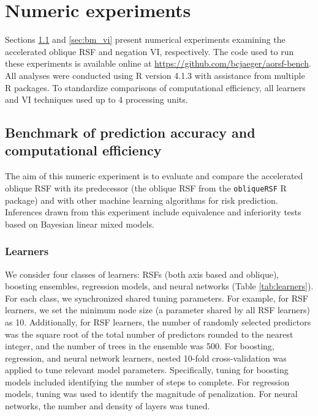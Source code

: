 \documentclass[twoside,11pt]{article}\usepackage[]{graphicx}\usepackage[]{xcolor}
\newcommand{\tabref}[1]{Table \ref{#1}}
\begin{document}
\section{Numeric experiments}




Sections \ref{sec:bm_pred} and \ref{sec:bm_vi} present numerical experiments examining the accelerated oblique RSF and negation VI, respectively. The code used to run these experiments is available online at \href{https://github.com/bcjaeger/aorsf-bench}{https://github.com/bcjaeger/aorsf-bench}. All analyses were conducted using R version 4.1.3 with assistance from multiple R packages. To standardize comparisons of computational efficiency, all learners and VI techniques used up to 4 processing units.

\subsection{Benchmark of prediction accuracy and computational efficiency} \label{sec:bm_pred}

The aim of this numeric experiment is to evaluate and compare the accelerated oblique RSF with its predecessor (the oblique RSF from the \texttt{obliqueRSF} R package) and with other machine learning algorithms for risk prediction. Inferences drawn from this experiment include equivalence and inferiority tests based on Bayesian linear mixed models.

\subsubsection{Learners} \label{sec:learners}

We consider four classes of learners: RSFs (both axis based and oblique), boosting ensembles, regression models, and neural networks (\tabref{tab:learners}). For each class, we synchronized shared tuning parameters. For example, for RSF learners, we set the minimum node size (a parameter shared by all RSF learners) as 10. Additionally, for RSF learners, the number of randomly selected predictors was the square root of the total number of predictors rounded to the nearest integer, and the number of trees in the ensemble was 500. For boosting, regression, and neural network learners, nested 10-fold cross-validation was applied to tune relevant model parameters. Specifically, tuning for boosting models included identifying the number of steps to complete. For regression models, tuning was used to identify the magnitude of penalization. For neural networks, the number and density of layers was tuned.
\end{document}
